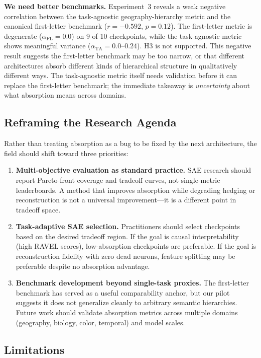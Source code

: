 \documentclass{article}
\begin{document}
\textbf{We need better benchmarks.} Experiment~3 reveals a weak negative correlation between the task-agnostic geography-hierarchy metric and the canonical first-letter benchmark ($r = -0.592$, $p = 0.12$). The first-letter metric is degenerate ($\alpha_{\text{FL}} = 0.0$) on 9 of 10 checkpoints, while the task-agnostic metric shows meaningful variance ($\alpha_{\text{TA}} = 0.0$--$0.24$). H3 is not supported. This negative result suggests the first-letter benchmark may be too narrow, or that different architectures absorb different kinds of hierarchical structure in qualitatively different ways. The task-agnostic metric itself needs validation before it can replace the first-letter benchmark; the immediate takeaway is \emph{uncertainty} about what absorption means across domains.

\subsection{Reframing the Research Agenda}

Rather than treating absorption as a bug to be fixed by the next architecture, the field should shift toward three priorities:

\begin{enumerate}
    \item \textbf{Multi-objective evaluation as standard practice.} SAE research should report Pareto-front coverage and tradeoff curves, not single-metric leaderboards. A method that improves absorption while degrading hedging or reconstruction is not a universal improvement---it is a different point in tradeoff space.
    \item \textbf{Task-adaptive SAE selection.} Practitioners should select checkpoints based on the desired tradeoff region. If the goal is causal interpretability (high RAVEL scores), low-absorption checkpoints are preferable. If the goal is reconstruction fidelity with zero dead neurons, feature splitting may be preferable despite no absorption advantage.
    \item \textbf{Benchmark development beyond single-task proxies.} The first-letter benchmark has served as a useful comparability anchor, but our pilot suggests it does not generalize cleanly to arbitrary semantic hierarchies. Future work should validate absorption metrics across multiple domains (geography, biology, color, temporal) and model scales.
\end{enumerate}

\subsection{Limitations}
\end{document}
